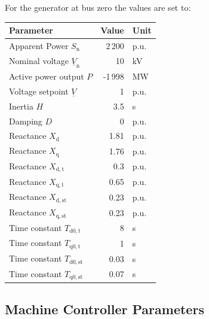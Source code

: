 \vspace*{1cm}

For the generator at bus zero the values are set to:

\begin{tabularx}{\textwidth}{Xrl}
    \textbf{Parameter} & \textbf{Value} & \textbf{Unit} \\ \hline
    \toprule
    Apparent Power $S_\mathrm{n}$ & 2\,200 & p.u. \\
    Nominal voltage $\underline{V}_\mathrm{n}$ & 10 & kV \\
    Active power output $P$ & -1\,998 & MW \\
    Voltage setpoint $\underline{V}$ & 1 & p.u. \\
    Inertia $H$ & 3.5 & s \\
    Damping $D$ & 0 & p.u. \\
    Reactance $X_\mathrm{d}$ & 1.81 & p.u. \\
    Reactance $X_\mathrm{q}$ & 1.76 & p.u. \\
    Reactance $X_\mathrm{d,t}$ & 0.3 & p.u. \\
    Reactance $X_\mathrm{q,t}$ & 0.65 & p.u. \\
    Reactance $X_\mathrm{d,st}$ & 0.23 & p.u. \\
    Reactance $X_\mathrm{q,st}$ & 0.23 & p.u. \\
    Time constant $T_\mathrm{d0,t}$ & 8 & s \\
    Time constant $T_\mathrm{q0,t}$ & 1 & s \\
    Time constant $T_\mathrm{d0,st}$ & 0.03 & s \\
    Time constant $T_\mathrm{q0,st}$ & 0.07 & s \\
    \bottomrule
\end{tabularx}

\vspace*{1cm}

\subsection{Machine Controller Parameters}
\label{app:machine-controllers}

